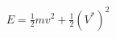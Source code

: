 \documentclass[preview]{standalone}
\begin{document}
\begin{align*}
E = \frac{1}{2} m v^2 + \frac{1}{2} (V^*)^2
\end{align*}
\end{document}
